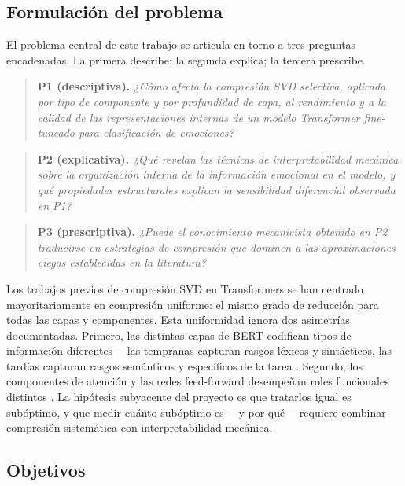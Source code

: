 \subsection{Formulación del problema}
\label{sec:formulacion-problema}

El problema central de este trabajo se articula en torno a tres preguntas
encadenadas. La primera describe; la segunda explica; la tercera prescribe.

\begin{quote}
    \textbf{P1 (descriptiva).} \textit{¿Cómo afecta la compresión SVD selectiva,
    aplicada por tipo de componente y por profundidad de capa, al rendimiento y a
    la calidad de las representaciones internas de un modelo Transformer
    \emph{fine-tuneado} para clasificación de emociones?}
\end{quote}

\begin{quote}
    \textbf{P2 (explicativa).} \textit{¿Qué revelan las técnicas de interpretabilidad
    mecánica sobre la organización interna de la información emocional en el
    modelo, y qué propiedades estructurales explican la sensibilidad diferencial
    observada en P1?}
\end{quote}

\begin{quote}
    \textbf{P3 (prescriptiva).} \textit{¿Puede el conocimiento mecanicista
    obtenido en P2 traducirse en estrategias de compresión que dominen a las
    aproximaciones ciegas establecidas en la literatura?}
\end{quote}

Los trabajos previos de compresión SVD en Transformers \cite{noach2020compressing,
hsu2022language} se han centrado mayoritariamente en compresión uniforme: el mismo
grado de reducción para todas las capas y componentes. Esta uniformidad ignora dos
asimetrías documentadas. Primero, las distintas capas de BERT codifican tipos de
información diferentes ---las tempranas capturan rasgos léxicos y sintácticos, las
tardías capturan rasgos semánticos y específicos de la tarea \cite{tenney2019bert,
jawahar2019what}. Segundo, los componentes de atención y las redes feed-forward
desempeñan roles funcionales distintos \cite{geva2021transformer, voita2019analyzing}.
La hipótesis subyacente del proyecto es que tratarlos igual es subóptimo, y que
medir cuánto subóptimo es ---y por qué--- requiere combinar compresión sistemática
con interpretabilidad mecánica.


\subsection{Objetivos}
\label{sec:objetivos}


